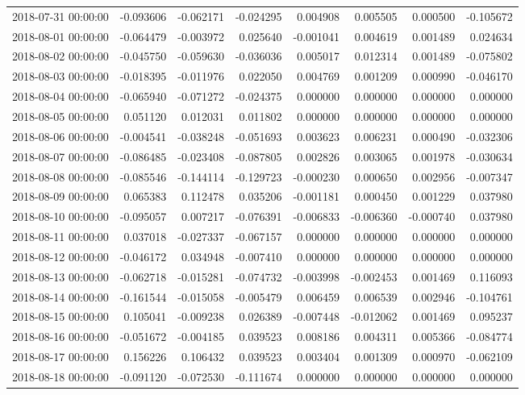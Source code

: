 \begin{tabular}{lrrrrrrr}
2018-07-31 00:00:00 & -0.093606 & -0.062171 & -0.024295 & 0.004908 & 0.005505 & 0.000500 & -0.105672 \\
2018-08-01 00:00:00 & -0.064479 & -0.003972 & 0.025640 & -0.001041 & 0.004619 & 0.001489 & 0.024634 \\
2018-08-02 00:00:00 & -0.045750 & -0.059630 & -0.036036 & 0.005017 & 0.012314 & 0.001489 & -0.075802 \\
2018-08-03 00:00:00 & -0.018395 & -0.011976 & 0.022050 & 0.004769 & 0.001209 & 0.000990 & -0.046170 \\
2018-08-04 00:00:00 & -0.065940 & -0.071272 & -0.024375 & 0.000000 & 0.000000 & 0.000000 & 0.000000 \\
2018-08-05 00:00:00 & 0.051120 & 0.012031 & 0.011802 & 0.000000 & 0.000000 & 0.000000 & 0.000000 \\
2018-08-06 00:00:00 & -0.004541 & -0.038248 & -0.051693 & 0.003623 & 0.006231 & 0.000490 & -0.032306 \\
2018-08-07 00:00:00 & -0.086485 & -0.023408 & -0.087805 & 0.002826 & 0.003065 & 0.001978 & -0.030634 \\
2018-08-08 00:00:00 & -0.085546 & -0.144114 & -0.129723 & -0.000230 & 0.000650 & 0.002956 & -0.007347 \\
2018-08-09 00:00:00 & 0.065383 & 0.112478 & 0.035206 & -0.001181 & 0.000450 & 0.001229 & 0.037980 \\
2018-08-10 00:00:00 & -0.095057 & 0.007217 & -0.076391 & -0.006833 & -0.006360 & -0.000740 & 0.037980 \\
2018-08-11 00:00:00 & 0.037018 & -0.027337 & -0.067157 & 0.000000 & 0.000000 & 0.000000 & 0.000000 \\
2018-08-12 00:00:00 & -0.046172 & 0.034948 & -0.007410 & 0.000000 & 0.000000 & 0.000000 & 0.000000 \\
2018-08-13 00:00:00 & -0.062718 & -0.015281 & -0.074732 & -0.003998 & -0.002453 & 0.001469 & 0.116093 \\
2018-08-14 00:00:00 & -0.161544 & -0.015058 & -0.005479 & 0.006459 & 0.006539 & 0.002946 & -0.104761 \\
2018-08-15 00:00:00 & 0.105041 & -0.009238 & 0.026389 & -0.007448 & -0.012062 & 0.001469 & 0.095237 \\
2018-08-16 00:00:00 & -0.051672 & -0.004185 & 0.039523 & 0.008186 & 0.004311 & 0.005366 & -0.084774 \\
2018-08-17 00:00:00 & 0.156226 & 0.106432 & 0.039523 & 0.003404 & 0.001309 & 0.000970 & -0.062109 \\
2018-08-18 00:00:00 & -0.091120 & -0.072530 & -0.111674 & 0.000000 & 0.000000 & 0.000000 & 0.000000 \\

\end{tabular}
